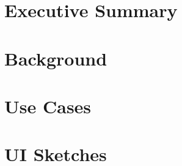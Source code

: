 





\newpage

\section{Executive Summary}



\section{Background}



\appendix

\section{Use Cases}



\section{UI Sketches}




